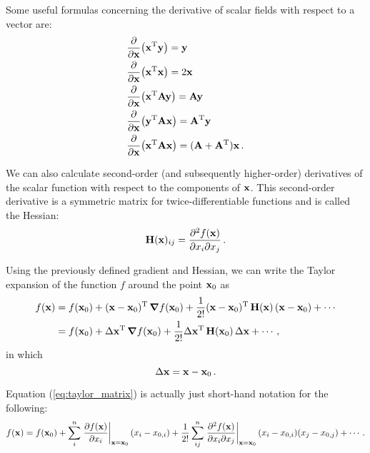         Some useful formulas concerning the derivative of scalar fields with respect to a vector are:
        \begin{align}
            & \pdv{\vb{x}} (\vb{x}^\text{T} \vb{y}) = \vb{y} \\
            & \pdv{\vb{x}} (\vb{x}^\text{T} \vb{x}) = 2 \vb{x} \\
            & \pdv{\vb{x}} (\vb{x}^\text{T} \vb{A} \vb{y}) = \vb{A} \vb{y} \\
            & \pdv{\vb{x}} (\vb{y}^\text{T} \vb{A} \vb{x}) = \vb{A}^\text{T} \vb{y} \\
            & \pdv{\vb{x}} (\vb{x}^\text{T} \vb{A} \vb{x}) = (\vb{A} + \vb{A}^\text{T}) \vb{x} \thinspace .
        \end{align}

        We can also calculate second-order (and subsequently higher-order) derivatives of the scalar function with respect to the components of $\vb{x}$. This second-order derivative is a symmetric matrix for twice-differentiable functions and is called the Hessian:
        \begin{equation}
            \vb{H}(\vb{x})_{ij} = \pdv{f(\vb{x})}{x_i}{x_j} \thinspace .
        \end{equation}

        Using the previously defined gradient and Hessian, we can write the Taylor expansion of the function $f$ around the point $\vb{x}_0$ as
        \begin{align}
            f(\vb{x}) &= f(\vb{x}_0) + (\vb{x} - \vb{x}_0)^\text{T} \thinspace \grad{f(\vb{x}_0)} + \frac{1}{2!} (\vb{x} - \vb{x}_0)^\text{T} \thinspace \vb{H}(\vb{x}) \thinspace (\vb{x} - \vb{x}_0) + \cdots \label{eq:taylor_matrix} \\
            &= f(\vb{x}_0) + \Delta \vb{x}^\text{T} \thinspace \grad{f(\vb{x}_0)} + \frac{1}{2!} \Delta \vb{x}^\text{T} \thinspace \vb{H}(\vb{x}_0) \thinspace \Delta \vb{x} + \cdots \thinspace ,
        \end{align}
        in which
        \begin{equation}
            \Delta \vb{x} = \vb{x} - \vb{x}_0 \thinspace .
        \end{equation}

        Equation (\ref{eq:taylor_matrix}) is actually just short-hand notation for the following:
        \begin{equation}
            f(\vb{x}) = f(\vb{x}_0) + \sum_i^n \eval{\pdv{f(\vb{x})}{x_i}}_{\vb{x}=\vb{x}_0} (x_i - x_{0,i}) + \frac{1}{2!} \sum_{ij}^n \eval{\pdv{f(\vb{x})}{x_i}{x_j}}_{\vb{x}=\vb{x}_0} (x_i - x_{0,i}) (x_j - x_{0,j}) + \cdots \thinspace .
        \end{equation}

